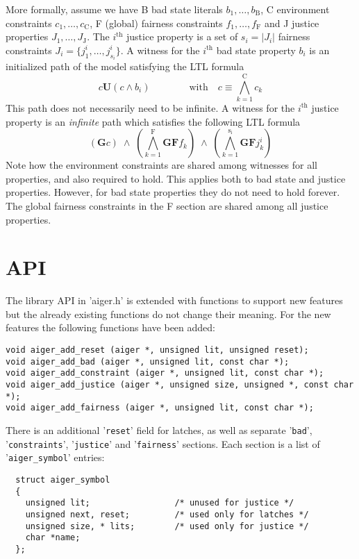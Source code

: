 \documentclass{llncs}
\begin{document}
More formally, assume we have B bad state literals $b_1, \ldots,
b_{\mathrm{B}}$, C environment constraints $c_1, \ldots, c_{\mathrm{C}}$,
F (global) fairness constraints $f_1, \ldots, f_{\mathrm{F}}$ and J
justice properties $J_1,\ldots,J_{\mathrm{J}}$.   The
$i^{\mathrm{th}}$ justice property is a set of $s_i = |J_i|$ fairness
constraints $J_i = \{j^i_1,\ldots,j^i_{s_i}\}$.  A witness for the
$i^{\mathrm{th}}$ bad state property $b_i$ is an initialized path of the
model satisfying the LTL formula
\[
{c} \mathrel{\mathbf{U}} (c \wedge b_i)
\qquad
\qquad
\mbox{with}
\quad
 c \equiv \bigwedge_{k=1}^{\mathrm{C}} c_k
\]
This path does not necessarily need to be infinite.  A witness for the
$i^{\mathrm{th}}$ justice property is an \emph{infinite} path which satisfies
the following LTL formula
\[
(\mathrel{\mathbf{G}} c)
\;\wedge\;
(\bigwedge_{k=1}^{\mathrm{F}} {\mathrel{\mathbf{G}} \mathrel{\mathbf{F}} f_k})
\;\wedge\;
(\bigwedge_{k=1}^{\mathrm{s_i}} {\mathrel{\mathbf{G}} \mathrel{\mathbf{F}} j_k^i})
\]
Note how the environment constraints are shared among witnesses for all
properties, and also required to hold.  This applies both to bad state and
justice properties. However, for bad state properties they do not need to
hold forever.  The global fairness constraints in the F section are shared
among all justice properties.

\section{API}

The library API in 'aiger.h' is extended with functions to support new
features but the already existing functions do not change their meaning.
For the new features the following functions have been added:
{\small
\begin{verbatim}
void aiger_add_reset (aiger *, unsigned lit, unsigned reset);
void aiger_add_bad (aiger *, unsigned lit, const char *);
void aiger_add_constraint (aiger *, unsigned lit, const char *);
void aiger_add_justice (aiger *, unsigned size, unsigned *, const char *);
void aiger_add_fairness (aiger *, unsigned lit, const char *);
\end{verbatim}}

There is an additional '\texttt{reset}' field for latches, as well as 
separate '\texttt{bad}', '\texttt{constraints}', '\texttt{justice}' and
'\texttt{fairness}' sections.  Each section
is a list of '\texttt{aiger\_symbol}' entries:

{\small
\begin{verbatim}
  struct aiger_symbol
  {
    unsigned lit;                 /* unused for justice */
    unsigned next, reset;         /* used only for latches */
    unsigned size, * lits;        /* used only for justice */
    char *name;
  };
\end{verbatim}}
\end{document}
